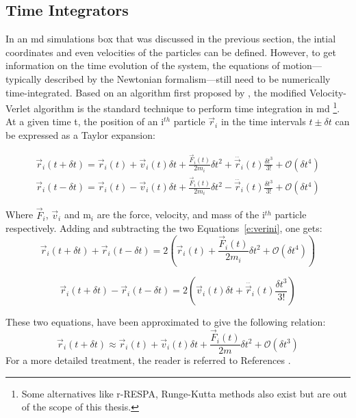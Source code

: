 \subsection{Time Integrators}
In an \gls{md} simulations box that was discussed in the previous section, the intial coordinates and even velocities of the particles can be defined. However, to get information on the time evolution of the system, the equations of motion---typically described by the Newtonian formalism---still need to be numerically time-integrated. Based on an algorithm first proposed by \textcite{Verlet1967}, the modified Velocity-Verlet algorithm \cite{Swope1982} is the standard technique to perform time integration in \gls{md} \footnote{Some alternatives like r-RESPA, Runge-Kutta methods also exist but are out of the scope of this thesis.}. At a given time t, the position of an i$^{th}$  particle $\vec{r}_i$ in  the time intervals $t \pm \delta t$ can be expressed as a Taylor expansion:

\begin{equation} \label{e:verini}
\begin{gathered}
	\vec{r}_i(t+\delta t) = \vec{r}_i(t) + \vec{v}_i(t)\delta t + \frac{\vec{F}_i(t)}{2m_i}\delta t^2 + \dddot{\vec{r}_i}(t) \frac{\delta t^3}{3!} + \mathcal{O}(\delta t ^4) \\
	\vec{r}_i(t-\delta t) = \vec{r}_i(t) - \vec{v}_i(t)\delta t + \frac{\vec{F}_i(t)}{2m_i}\delta t^2 - \dddot{\vec{r}_i}(t) \frac{\delta t^3}{3!} + \mathcal{O}(\delta t ^4) 
\end{gathered}
\end{equation}

Where $\vec{F}_i$, $\vec{v}_i$ and m$_i$ are the force, velocity, and mass of the i$^{th}$ particle respectively. Adding and subtracting the two Equations~\ref{e:verini}, one gets:
\begin{equation}
\vec{r}_i(t+\delta t) + \vec{r}_i(t-\delta t) = 2 \left(\vec{r}_i(t) + \frac{\vec{F}_i(t)}{2m_i}\delta t^2 + \mathcal{O}(\delta t ^4) \right)
\end{equation}

\begin{equation}
\vec{r}_i(t+\delta t) - \vec{r}_i(t-\delta t) = 2 \left(\vec{v}_i(t)\delta t + \dddot{\vec{r}_i}(t) \frac{\delta t^3}{3!}  \right)
\end{equation}

These two equations, have been approximated to give the following relation:
\begin{equation} \label{e:rvelver}
\vec{r}_i(t+\delta t) \approx \vec{r}_i(t) + \vec{v}_i(t)\delta t + \frac{\vec{F}_i(t)}{2m}\delta t^2 +\mathcal{O}(\delta t ^3)  %
\end{equation}
For a more detailed treatment, the reader is referred to References \cite{Frenkel1997,Lee2016}.

